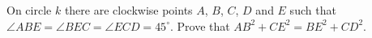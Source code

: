 On circle $k$ there are clockwise points $A$, $B$, $C$, $D$ and $E$ such that $\angle ABE = \angle BEC = \angle ECD = 45^{\circ}$. Prove that $AB^2 + CE^2 = BE^2 + CD^2$.
